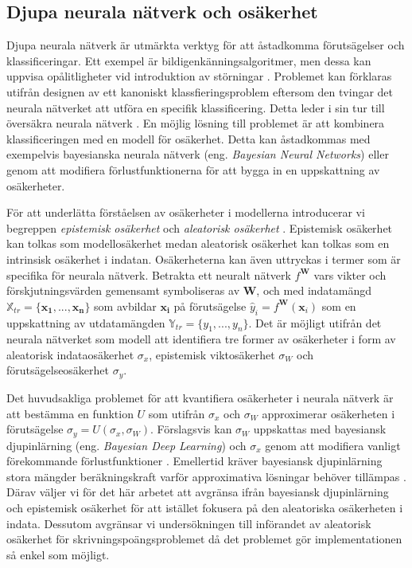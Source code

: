 \subsection{Djupa neurala nätverk och osäkerhet}
\label{NN_and_uncert}
Djupa neurala nätverk är utmärkta verktyg för att åstadkomma förutsägelser och klassificeringar. Ett exempel är bildigenkänningsalgoritmer, men dessa kan uppvisa opålitligheter vid introduktion av störningar \cite{Elephant}. Problemet kan förklaras utifrån designen av ett kanoniskt klassfieringsproblem eftersom den tvingar det neurala nätverket att utföra en specifik klassificering. Detta leder i sin tur till översäkra neurala nätverk \cite{Kendall-Gal}. En möjlig lösning till problemet är att kombinera klassificeringen med en modell för osäkerhet. Detta kan åstadkommas med exempelvis bayesianska neurala nätverk (eng. \emph{Bayesian Neural Networks}) \cite{Kendall-Gal} eller genom att modifiera förlustfunktionerna för att bygga in en uppskattning av osäkerheter.

För att underlätta förståelsen av osäkerheter i modellerna introducerar vi begreppen \emph{epistemisk osäkerhet} \cite{Uncert} och \emph{aleatorisk osäkerhet} \cite{Uncert}. Epistemisk osäkerhet kan tolkas som modellosäkerhet medan aleatorisk osäkerhet kan tolkas som en intrinsisk osäkerhet i indatan. Osäkerheterna kan även uttryckas i termer som är specifika för neurala nätverk. Betrakta ett neuralt nätverk $f^\mathbf{W}$ vars vikter och förskjutningsvärden gemensamt symboliseras av $\mathbf{W}$, och med indatamängd $\mathbb{X}_{tr} = \{\mathbf{x_1},..., \mathbf{x_n}\}$ som avbildar $\mathbf{x_i}$ på förutsägelse $\hat{y}_i = f^\mathbf{W}(\mathbf{x}_i)$ som en uppskattning av utdatamängden $\mathbb{Y}_{tr} = \{y_1,..., y_n\}$. Det är möjligt utifrån det neurala nätverket som modell att identifiera tre former av osäkerheter i form av aleatorisk indataosäkerhet $\sigma_x$, epistemisk viktosäkerhet $\sigma_W$ och förutsägelseosäkerhet $\sigma_y$.

Det huvudsakliga problemet för att kvantifiera osäkerheter i neurala nätverk är att bestämma en funktion $U$ som utifrån $\sigma_x$ och $\sigma_W$ approximerar osäkerheten i förutsägelse $\sigma_y = U(\sigma_x, \sigma_W)$. Förslagsvis kan $\sigma_W$ uppskattas med bayesiansk djupinlärning (eng. \emph{Bayesian Deep Learning}) \cite{Kendall-Gal} och $\sigma_x$ genom att modifiera vanligt förekommande förlustfunktioner \cite{Kendall-Gal}. Emellertid kräver bayesiansk djupinlärning stora mängder beräkningskraft varför approximativa lösningar behöver tillämpas \cite{MC-dropout}. Därav väljer vi för det här arbetet att avgränsa ifrån bayesiansk djupinlärning och epistemisk osäkerhet för att istället fokusera på den aleatoriska osäkerheten i indata. Dessutom avgränsar vi undersökningen till införandet av aleatorisk osäkerhet för skrivningspoängsproblemet då det problemet gör implementationen så enkel som möjligt.

